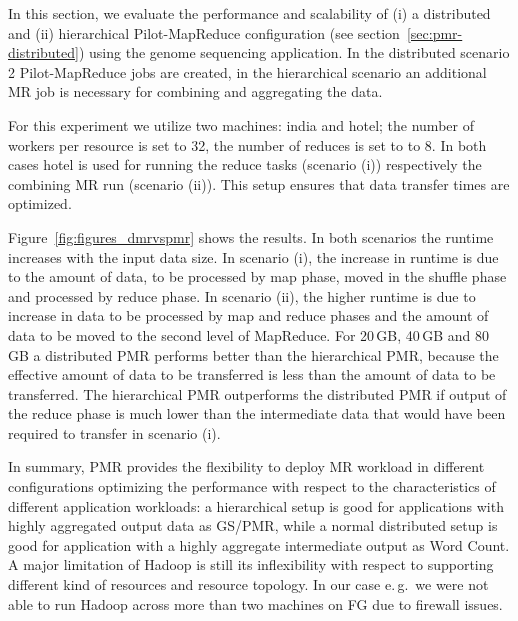 \documentclass{acm_proc_article-sp}
\newcommand{\pnote}[1]{ {\textcolor{magenta} { ***pradeep: #1 }}}
\newcommand{\pnote}[1]{}
\newcommand{\pilotmapreduce}{Pilot-MapReduce\xspace}
\begin{document}
In this section, we evaluate the performance and scalability of (i) a 
distributed and (ii) hierarchical \pilotmapreduce configuration (see
section~\ref{sec:pmr-distributed}) using the genome sequencing application.
In the distributed scenario 2 \pilotmapreduce jobs are created, in the  
hierarchical scenario an additional MR job is necessary for combining and 
aggregating the data.

For this experiment we utilize two machines: india and hotel; the number of
workers per resource is set to 32, the number of reduces is set to to 8. In
both cases hotel is used for running the reduce tasks (scenario (i))
respectively the combining MR run (scenario (ii)). This setup ensures that
data transfer times are optimized.




Figure~\ref{fig:figures_dmrvspmr} shows the results. In both scenarios the
runtime increases with the input data size. In scenario (i), the increase in
runtime is due to the amount of data, to be processed by map phase, moved in
the shuffle phase and processed by reduce phase. In scenario (ii), the higher
runtime is due to increase in data to be processed by map and reduce phases
and the amount of data to be moved to the second level of MapReduce. For
20\,GB, 40\,GB and 80\,GB a distributed PMR performs better than the
hierarchical PMR, because the effective amount of data to be transferred is
less than the amount of data to be transferred. The hierarchical PMR 
outperforms the distributed PMR if output of the reduce phase is much lower 
than the intermediate data that would have been required to transfer in 
scenario (i).

In summary, PMR provides the flexibility to deploy MR workload in different
configurations optimizing the performance with respect to the characteristics
of different application workloads: a hierarchical setup is good for
applications with highly aggregated output data as GS/PMR, while a normal
distributed setup is good for application with a highly aggregate intermediate
output as Word Count. A major limitation of Hadoop is still its inflexibility
with respect to supporting different kind of resources and resource topology.
In our case e.\,g.\ we were not able to run Hadoop across more than two
machines on FG due to firewall issues.
\end{document}
